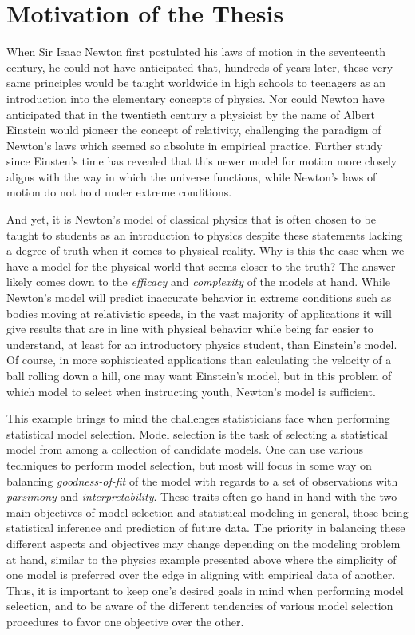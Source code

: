 \doublespace
{}
		\section{Motivation of the Thesis}
		When Sir Isaac Newton first postulated his laws of motion in the seventeenth century, he could not have anticipated that, hundreds of years later, these very same principles would
		be taught worldwide in high schools to teenagers as an introduction into the elementary concepts of physics. Nor could Newton have anticipated that in the twentieth century a
		physicist by the name of Albert Einstein would pioneer the concept of relativity, challenging the paradigm of Newton's laws which seemed so absolute in empirical practice. Further study
		since Einsten's time has revealed that this newer model for motion more closely aligns with the way in which the universe functions, while Newton's laws of motion do not hold
		under extreme conditions.

		And yet, it is Newton's model of classical physics that is often chosen to be taught to students as an introduction to physics despite these statements lacking a degree of truth when
		it comes to physical reality. Why is this the case when we have a model for the physical world that seems closer to the truth? The answer likely comes down to the \textit{efficacy} and
		\textit{complexity} of the models at hand. While Newton's model will predict inaccurate behavior in extreme conditions such as bodies moving at relativistic speeds, in the
		vast majority of applications it will give results that are in line with physical behavior while being far easier to understand, at least for an introductory physics student, than 
		Einstein's model. Of course, in more sophisticated applications than calculating the velocity of a ball rolling down a hill, one may want Einstein's model, but in this problem of 
		which model to select when instructing youth, Newton's model is sufficient.

		This example brings to mind the challenges statisticians face when performing statistical model selection. Model selection is the task of selecting a statistical model from among a
		collection of candidate models. One can use various techniques to perform model selection, but most will focus in some way on balancing \textit{goodness-of-fit} of the model with
		regards to a set of observations with \textit{parsimony} and \textit{interpretability}. These traits often go hand-in-hand with the two main objectives of model selection and 
		statistical modeling in general, those being statistical inference and prediction of future data. The priority in balancing these different aspects and objectives may change depending
		on the modeling problem at hand, similar to the physics example presented above where the simplicity of one model is preferred over the edge in aligning with empirical data of another.
		Thus, it is important to keep one's desired goals in mind when performing model selection, and to be aware of the different tendencies of various model selection procedures to favor
		one objective over the other.

